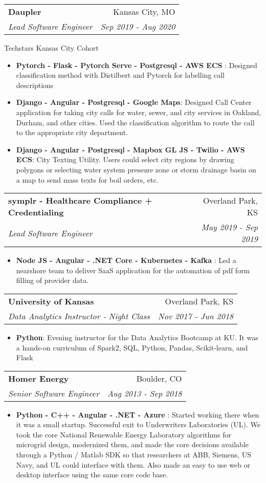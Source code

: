\documentclass[letterpaper,11pt]{article}
\makeatletter
\newcommand{\resumeItem}[2]{
  \item\small{
    \textbf{#1}{: #2 \vspace{-2pt}}
  }
}
\newcommand{\resumeSubheading}[4]{%
  \item
    \begin{tabular*}{0.97\textwidth}{l@{\extracolsep{\fill}}r}
      \textbf{#1} & #2 \\
      \textit{\small#3} & \textit{\small #4} \\

    \end{tabular*}%
}
\newcommand{\resumeItemListStart}{\begin{itemize}}
\newcommand{\resumeItemListEnd}{\end{itemize}\vspace{-5pt}}
\makeatother
\begin{document}
    \resumeSubheading
      {Daupler}{Kansas City, MO}
      {Lead Software Engineer}{Sep 2019 - Aug 2020}
      { Techstars Kansas City Cohort }
      \resumeItemListStart
        \resumeItem{Pytorch - Flask - Pytorch Serve - Postgresql - AWS ECS }
          {Designed classification method with Distilbert and Pytorch for labelling call descriptions }
        \resumeItem{Django - Angular - Postgresql -  Google Maps}
          {Designed Call Center application for taking city calls for water, sewer, and city services in Oakland, Durham, and other cities. Used the classification algorithm to route the call to the appropriate city department. }
        \resumeItem{Django - Angular - Postgresql - Mapbox GL JS - Twilio - AWS ECS}
          {City Texting Utility. Users could select city regions by drawing polygons or selecting water system pressure zone or storm drainage basin on a map to send mass texts for boil orders, etc.}
      \resumeItemListEnd


    \resumeSubheading
      {symplr - Healthcare Compliance + Credentialing}{Overland Park, KS}
      {Lead Software Engineer}{May 2019 - Sep 2019}
      \resumeItemListStart
        \resumeItem{Node JS - Angular - .NET Core - Kubernetes - Kafka }
          {Led a nearshore team to deliver SaaS application for the automation of pdf form filling of provider data. }
      \resumeItemListEnd

 
    \resumeSubheading
      {University of Kansas}{Overland Park, KS}
      {Data Analytics Instructor - Night Class }{Nov 2017 - Jun 2018}
      \resumeItemListStart
        \resumeItem{Python}
        { Evening instructor for the Data Analytics Bootcamp at KU. It was a hands-on curriculum of Spark2, SQL, Python, Pandas, Scikit-learn, and Flask }
      \resumeItemListEnd

      \resumeSubheading
      {Homer Energy}{Boulder, CO}
      {Senior Software Engineer}{Aug 2013 - Sep 2018}
      \resumeItemListStart
        \resumeItem{Python - C++ - Angular - .NET - Azure }
          { Started working there when it was a small startup. Successful exit to Underwriters Laboratories (UL). We took the core National Renewable Energy Laboratory algorithms for microgrid design, modernized them, and made the core decisions available through a Python / Matlab SDK so that researchers at ABB, Siemens, US Navy, and UL could interface with them. Also made an easy to use web or desktop interface using the same core code base. }
      \resumeItemListEnd
     
 
\end{document}
